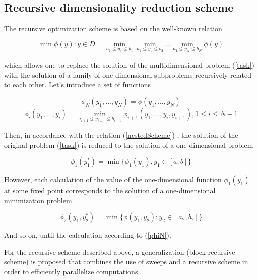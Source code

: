 \documentclass{svproc}
\begin{document}
\subsection{Recursive dimensionality reduction scheme}

The recursive optimization scheme is based on the well-known relation \cite{Ref22}

\begin{equation}
\label{nestedScheme}
\min{\phi(y):y\in D}=\min_{a_1\leqslant y_1\leqslant b_1}\min_{a_2\leqslant y_2\leqslant b_2}\dots\min_{a_1\leqslant y_N\leqslant b_N}\phi(y)
\end{equation}

which allows one to replace the solution of the multidimensional problem (\ref{task}) with the solution of a family of one-dimensional subproblems recursively related to each other.
Let's introduce a set of functions

\begin{equation}
\label{phiN}
\phi_N(y_1,\dots,y_N)=\phi(y_1,\dots,y_N)
\end{equation}
\begin{equation}
\label{phiI_}
\phi_i(y_1,\dots,y_i)=\min_{a_{i+1}\leqslant y_{i+1} \leqslant b_{i+1}}\phi_{i+1}(y_1,\dots,y_i,y_{i+1}),1\leqslant i\leqslant N-1
\end{equation}

Then, in accordance with the relation (\ref{nestedScheme}) , the solution of the original problem (\ref{task}) is reduced to the solution of a one-dimensional problem

\begin{equation}
\label{phiFirst}
\phi_1(y_1^*)=\min\{\phi_1(y_1),y_1\in [a,b]\}
\end{equation}

However, each calculation of the value of the one-dimensional function  \(\phi_1(y_1)\) at some fixed point corresponds to the solution of a one-dimensional minimization problem 

\begin{displaymath}
\label{phi2}
\phi_2(y_1,y_2^*)=\min\{\phi(y_1,y_2):y_2\in [a_2,b_2]\}
\end{displaymath}

And so on, until the calculation   according to (\ref{phiN}). 

For the recursive scheme described above, a generalization (block recursive scheme) is proposed that combines the use of sweeps and a recursive scheme in order to efficiently parallelize computations.
\end{document}
